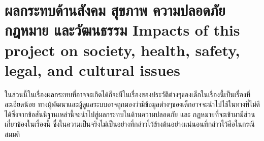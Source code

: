 \section{\ifcpe%
ผลกระทบด้านสังคม สุขภาพ ความปลอดภัย กฎหมาย และวัฒนธรรม
\else%
Impacts of this project on society, health, safety, legal, and cultural issues
\fi}

ในส่วนนี้ในเรื่องผลกระทบที่อาจจะเกิดได้ก็จะมีในเรื่องของประวัติต่างๆของเด็กในเรื่องนี้เป็นเรื่องที่ละเอียดน้อย ทางผู้พัฒนาและผู้ดูแลระบบอาจถูกมองว่ามีข้อมูลต่างๆของเด็กอาจจะนำไปใช้ในทางที่ไม่ดีได้ซึ่งจากข้อสันนิฐานเหล่านี้จะนำไปสู่ผลกระทบในด้านความปลอดภัย และ กฏหมายที่จะเข้ามามีส่วนเกี่ยวข้องในเรื่องนี้ ซึ่งในความเป็นจริงไม่เป็นอย่างที่กล่าวไว้ข้างต้นอย่างแน่นอนที่กล่าวไว้คือในกรณีสมมติ

